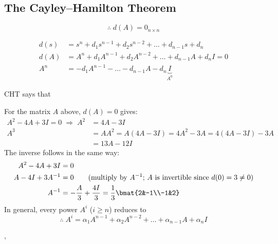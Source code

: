 \subsection{The Cayley--Hamilton Theorem}\label{ss:cht}
\begin{theorem}
\leavevmode{}
\[ \therefore\; d(A)=0_{n\times n} \]
\end{theorem}
\begin{align*}
d(s)&= s^n+d_1s^{n-1}+d_2s^{n-2}+\dots+d_{n-1}s+d_n\\
d(A)&= A^n+d_1A^{n-1}+d_2A^{n-2}+\dots+d_{n-1}A+d_nI = 0\\
A^n &= -d_1A^{n-1}-\dots-d_{n-1}A-d_n\underbrace{I}_{A^0}
\end{align*}
\begin{remark}
CHT says that 
\end{remark}
For the matrix $A$ above, $d(A)=0$ gives:
\begin{align*}
A^2-4A+3I=0 \;\Rightarrow\; A^2 &= 4A-3I\\[2pt]
A^3 &= AA^2 = A(4A-3I)=4A^2-3A = 4(4A-3I)-3A\\
&= 13A-12I
\end{align*}
The inverse follows in the same way:
\begin{align*}
A^2-4A+3I&=0\\
A-4I+3A^{-1}&=0 \qquad\text{(multiply by $A^{-1}$; $A$ is invertible since $d(0)=3\neq0$)}\\
A^{-1}&=-\frac{A}{3}+\frac{4I}{3}=\frac13\bmat{2&-1\\-1&2}
\end{align*}
In general, every power $A^i$ ($i\ge n$) reduces to
\[
\therefore\; A^i = \alpha_1A^{n-1}+\alpha_2A^{n-2}+\dots+\alpha_{n-1}A+\alpha_nI
\]

\sep
